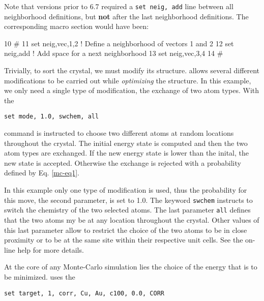 Note that \Discus versions prior to 6.7 required a {\tt set neig, add} line
between all neighborhood definitions, but {\bf not} after the last 
neighborhood definitions. The corresponding macro section would have been: 

\begin{MacVerbatim}
 10  #
 11  set neig,vec,1,2               ! Define a neighborhood of vectors 1 and 2
 12  set neig,add                   ! Add space for a next neighborhood
 13  set neig,vec,3,4
 14  #
\end{MacVerbatim}


Trivially, to sort the crystal, we must modify its structure. \Discus allows 
several different modifications to be carried out while {\it optimizing} the
structure. In this example, we only need a single type of modification, the 
exchange of two atom types. With the 

{\tt set mode, 1.0, swchem, all} 

command \Discus is instructed to choose two different atoms at random locations 
throughout the 
crystal. The initial energy state is computed and then the two atom types are 
exchanged. If the new energy state is lower than the inital, the new state 
is accepted. Otherwise the exchange is rejected with a probability
defined by Eq. \ref{mc-eq1}. 

In this example only one type of modification is used, thus the probability for
this move, the second parameter, is set to 1.0. The keyword {\tt swchem} 
instructs \Discus to switch the chemistry of the two selected atoms. The last 
parameter {\tt all} defines that the two atoms my be at any location throughout the 
crystal. Other values of this last parameter allow to restrict the choice 
of the two atoms to be in close proximity or to be at the same site within their 
respective unit cells. See the on-line help for more details.

At the core of any Monte-Carlo simulation lies the choice of the energy that is 
to be minimized. \Discus uses the 

{\tt set target, 1, corr, Cu, Au, c100, 0.0, CORR}

